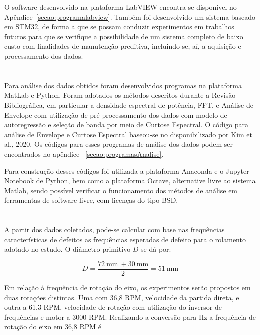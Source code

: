 \documentclass[
	12pt,				
	oneside,			
	a4paper,			
	english,			
	brazil,	
	sumario=abnt-6027-2012		
	]{abntex2ppgsi}
\begin{document}
O software desenvolvido na plataforma LabVIEW encontra-se disponível no Apêndice~\ref{secao:programalabview}. Também foi desenvolvido um sistema baseado em STM32, de forma a que se possam conduzir experimentos em trabalhos futuros para que se verifique a possibilidade de um sistema completo de baixo custo com finalidades de manutenção preditiva, incluindo-se, aí, a aquisição e processamento dos dados. 

\section{}

Para análise dos dados obtidos foram desenvolvidos programas na plataforma MatLab e Python. Foram adotados os métodos descritos durante a Revisão Bibliográfica, em particular a densidade espectral de potência, FFT, e Análise de Envelope com utilização de pré-processamento dos dados com modelo de autoregressão e seleção de banda por meio de Curtose Espectral. O código para análise de Envelope e Curtose Espectral baseou-se no disponibilizado por Kim et al., 2020. Os códigos para esses programas de análise dos dados podem ser encontrados no apêndice ~\ref{secao:programasAnalise}.

Para construção desses códigos foi utilizada a plataforma Anaconda e o Jupyter Notebook de Python, bem como a plataforma Octave, alternative livre ao sistema Matlab, sendo possível verificar o funcionamento dos métodos de análise em ferramentas de software livre, com licenças do tipo BSD. 

\section{}
\label{secao:calculoFrequencias}

A partir dos dados coletados, pode-se calcular com base nas frequências características de defeitos as frequências esperadas de defeito para o rolamento adotado no estudo. O diâmetro primitivo $D$ se dá por: 

\begin{equation}
	D = \frac{\SI{72}{\mm} \ + \SI{30}{\mm}}{2} = \SI{51}{\mm}
	\label{eq: Diametro Primitivo no Rolamento}
\end{equation}


Em relação à frequência de rotação do eixo, os experimentos serão propostos em duas rotações distintas. Uma com 36,8 RPM, velocidade da partida direta, e outra a 61,3 RPM, velocidade de rotação com utilização do inversor de frequências e motor a 3000 RPM. Realizando a conversão para Hz a frequência de rotação do eixo em 36,8 RPM é
\end{document}
